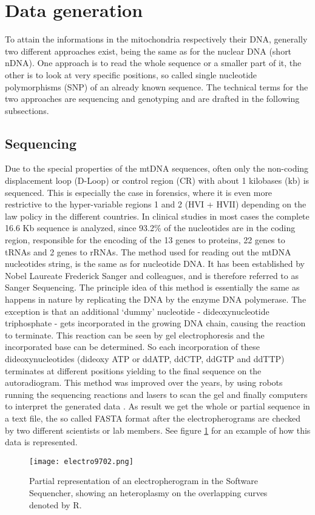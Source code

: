 \section{Data generation}
\label{sec:dataGeneration}
To attain the informations in the mitochondria respectively their DNA, generally two different approaches exist, being the same as for the nuclear DNA (short nDNA). One approach is to read the whole sequence or a smaller part of it, the other is to look at very specific positions, so called single nucleotide polymorphisms (SNP) of an already known sequence. The technical terms for the two approaches are sequencing and genotyping and are drafted in the following subsections.
\subsection{Sequencing}
Due to the special properties of the mtDNA sequences, often only the non-coding displacement loop (D-Loop) or control region (CR) with about 1 kilobases (kb) is sequenced. This is especially the case in forensics, where it is even more restrictive to the hyper-variable regions 1 and 2 (HVI + HVII) depending on the law policy in the different countries. In clinical studies in most cases the complete 16.6 Kb sequence is  analyzed, since 93.2\% of the nucleotides are in the coding region, responsible for the encoding of the 13 genes to proteins, 22 genes to tRNAs and 2 genes to rRNAs\cite{Sosa2012}. The method used for reading out the mtDNA nucleotides string, is the same as for nucleotide DNA. It has been established by Nobel Laureate Frederick Sanger and colleagues, and is therefore referred to as Sanger Sequencing. The principle idea of this method is essentially the same as happens in nature by replicating the DNA by the enzyme DNA polymerase.
The exception is that an additional `dummy' nucleotide - dideoxynucleotide triphosphate - gets incorporated in the growing DNA chain, causing the reaction to terminate. This reaction can be seen by gel electrophoresis and the incorporated base can be determined. So each incorporation of these dideoxynucleotides (dideoxy ATP or ddATP, ddCTP, ddGTP and ddTTP) terminates at different positions yielding to the final sequence on the autoradiogram.
This method was improved over the years, by using robots running the sequencing reactions and lasers to scan the gel and finally computers to interpret the generated data \cite{WallaceRobertA.SandersGeraldP.1996}. As result we get the whole or partial sequence in a text file, the so called FASTA format after the electropherograms are checked by two different scientists or lab members\cite{Weissensteiner2010}. See figure \ref{fig:figureElectro} for an example of how this data is represented. 
\begin{figure}[ht]
\begin{center}
\texttt{[image: electro9702.png]}
\caption[Representation of an electropherogram]{Partial representation of an electropherogram in the Software Sequencher, showing an heteroplasmy on the overlapping curves denoted by R.}
\label{fig:figureElectro}
\end{center}
\end{figure}

